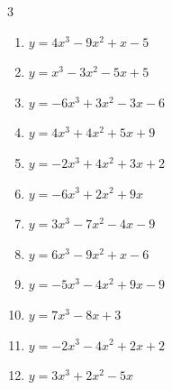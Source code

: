 \begin{multicols}{3}
\begin{enumerate}
\columnbreak %

\resetques

  \item $y=4x^{3}-9x^{2}+x-5$


  \item $y=x^{3}-3x^{2}-5x+5$


  \item $y=-6x^{3}+3x^{2}-3x-6$


  \item $y=4x^{3}+4x^{2}+5x+9$


  \item $y=-2x^{3}+4x^{2}+3x+2$


  \item $y=-6x^{3}+2x^{2}+9x$


  \item $y=3x^{3}-7x^{2}-4x-9$


  \item $y=6x^{3}-9x^{2}+x-6$


  \item $y=-5x^{3}-4x^{2}+9x-9$


  \item $y=7x^{3}-8x+3$


  \item $y=-2x^{3}-4x^{2}+2x+2$


  \item $y=3x^{3}+2x^{2}-5x$



\end{enumerate}
\end{multicols}
